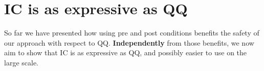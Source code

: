 %
%
%
%
%
%







\section{IC is as expressive as QQ}
\label{s:pattern1}
So far we have presented how using pre and post conditions benefits the safety of our approach 
with respect to QQ.
\textbf{Independently} from those benefits, 
we now aim to show that IC is as expressive as QQ, and possibly easier to use on the large scale.

